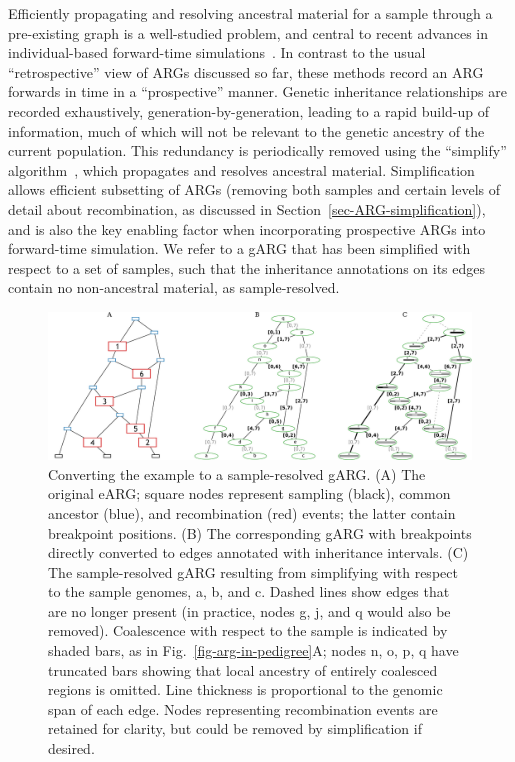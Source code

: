 \documentclass{article}
\newcommand{\noderef}[1]{\textsf{#1}}
\begin{document}
Efficiently propagating and resolving ancestral material for
a sample through a pre-existing graph is a well-studied problem,
and central to recent advances in individual-based forward-time
simulations~\citep{kelleher2018efficient,haller2018tree}.
In contrast to the usual ``retrospective'' view of ARGs
discussed so far, these methods record an ARG forwards in
time in a ``prospective'' manner. Genetic inheritance relationships
are recorded exhaustively, generation-by-generation,
leading to a rapid build-up of information, much of which
will not be relevant to the genetic ancestry of the current population.
This redundancy is periodically removed using the ``simplify''
algorithm~\citep{kelleher2018efficient}, which propagates and
resolves ancestral material.
Simplification allows efficient subsetting of ARGs (removing both samples and
certain levels of detail about recombination, as discussed in
Section~\ref{sec-ARG-simplification}), and is also the key enabling factor when
incorporating prospective ARGs into
forward-time simulation.
We refer to a gARG that has been simplified with respect to a set of
samples, such that the inheritance annotations on its edges contain
no non-ancestral material,  as sample-resolved.

\begin{figure}
\centering
\includegraphics[width=\textwidth]{illustrations/ancestry-resolution}
\caption{\label{fig-ancestry-resolution}
Converting the \citet[][Fig.~1]{wiuf1999recombination} example
to a sample-resolved gARG. (A) The original eARG; square nodes
represent sampling (black), common ancestor (blue), and recombination (red) events;
the latter contain breakpoint positions.
(B) The corresponding gARG with breakpoints directly converted to
edges annotated with inheritance intervals.
(C) The sample-resolved gARG resulting from simplifying with respect
to the sample genomes, \noderef{a}, \noderef{b}, and \noderef{c}.
Dashed lines show edges that are
no longer present (in practice, nodes \noderef{g}, \noderef{j}, and \noderef{q} would also be removed).
Coalescence with respect to the sample is indicated by shaded bars, as
in Fig.~\ref{fig-arg-in-pedigree}A; nodes \noderef{n}, \noderef{o}, \noderef{p}, \noderef{q} have truncated
bars showing that local ancestry of entirely coalesced regions is omitted.
Line thickness is proportional to the genomic span of each edge.
Nodes representing recombination events are retained
for clarity, but could be removed by simplification if
desired.
}
\end{figure}
\end{document}
